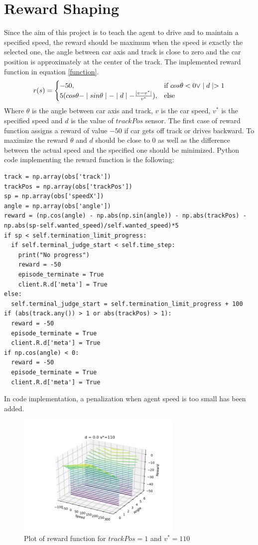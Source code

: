 \documentclass[Lau,oneside,noexaminfo]{sapthesis} %
\begin{document}
\section{Reward Shaping}
Since the aim of this project is to teach the agent to drive and to maintain a specified speed, the reward should be maximum when the speed is exactly the selected one, the angle between car axis and track is close to zero and the car position is approximately at the center of the track.
The implemented reward function in equation \ref{function}.
\begin{equation}
r(s) = \begin{cases} -50, & \mbox{if } cos \theta < 0  \vee \mid d \mid > 1 \\ 5(cos\theta - \mid sin\theta \mid - \mid d \mid - {\mid v - v^*\mid \over v^*}), & \mbox{else} \end{cases}
\label{reward_function}
\end{equation}
Where $\theta$ is the angle between car axis and track, $v$ is the car speed, $v^*$ is the specified speed and $d$ is the value of $trackPos$ sensor. The first case of reward function assigns a reward of value $-50$ if car gets off track or drives backward.
To maximize the reward $\theta$ and $d$ should be close to $0$ as well as the difference between the actual speed and the specified one should be minimized.
Python code implementing the reward function is the following:
\begin{lstlisting}
track = np.array(obs['track'])
trackPos = np.array(obs['trackPos'])
sp = np.array(obs['speedX'])
angle = np.array(obs['angle'])
reward = (np.cos(angle) - np.abs(np.sin(angle)) - np.abs(trackPos) - np.abs(sp-self.wanted_speed)/self.wanted_speed)*5
if sp < self.termination_limit_progress:
  if self.terminal_judge_start < self.time_step:
    print("No progress")
    reward = -50
    episode_terminate = True
    client.R.d['meta'] = True
else:
  self.terminal_judge_start = self.termination_limit_progress + 100
if (abs(track.any()) > 1 or abs(trackPos) > 1):
  reward = -50
  episode_terminate = True
  client.R.d['meta'] = True
if np.cos(angle) < 0:
  reward = -50
  episode_terminate = True
  client.R.d['meta'] = True
\end{lstlisting}
In code implementation, a penalization when agent speed is too small has been added.
\begin{figure}[H]
  \centering
  \includegraphics[width=0.7\textwidth]{reward_plot0}
  \caption{Plot of reward function for $trackPos = 1$ and $v^*=110$}
  \label{rewardshapingplot0}
\end{figure}
\end{document}
